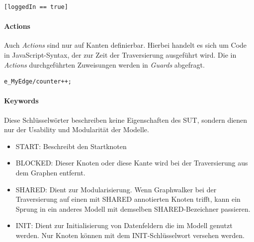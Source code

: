 \begin{verbatim}
[loggedIn == true]
\end{verbatim}

\paragraph{Actions} Auch \textit{Actions} sind nur auf Kanten definierbar. Hierbei handelt es sich um Code in JavaScript-Syntax, der zur Zeit der Traversierung ausgeführt wird. Die in \textit{Actions} durchgeführten Zuweisungen werden in \textit{Guards} abgefragt.

\begin{verbatim}
e_MyEdge/counter++;
\end{verbatim}

\paragraph{Keywords} Diese Schlüsselwörter beschreiben keine Eigenschaften des SUT, sondern dienen nur der Usability und Modularität der Modelle.

\begin{itemize}
\item START: Beschreibt den Startknoten
\item BLOCKED: Dieser Knoten oder diese Kante wird bei der Traversierung aus dem Graphen entfernt.
\item SHARED: Dient zur Modularisierung. Wenn Graphwalker bei der Traversierung auf einen mit SHARED annotierten Knoten trifft, kann ein Sprung in ein anderes Modell mit demselben SHARED-Bezeichner passieren.
\item INIT: Dient zur Initialisierung von Datenfeldern die im Modell genutzt werden. Nur Knoten können mit dem INIT-Schlüsselwort versehen werden.
\end{itemize} 

